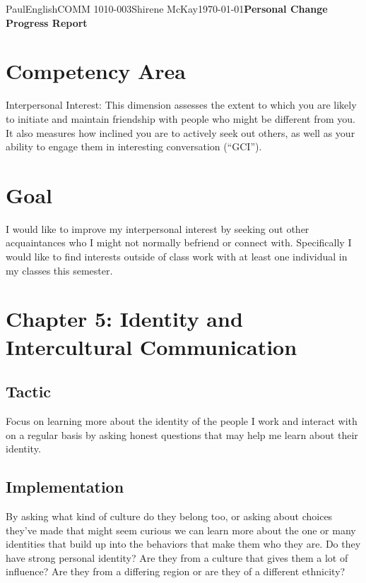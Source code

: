 \documentclass[12pt,letterpaper]{article}
\begin{document}
\begin{mla}{Paul}{English}{COMM 1010-003}{Shirene
    McKay}{\today}{\textbf{Personal Change Progress Report}}

\section{Competency Area}

Interpersonal Interest: This dimension assesses the extent to which
you are likely to initiate and maintain friendship with people who
might be different from you. It also measures how inclined you are to
actively seek out others, as well as your ability to engage them in
interesting conversation (``GCI'').

\section{Goal}

I would like to improve my interpersonal interest by seeking out other
acquaintances who I might not normally befriend or connect with.
Specifically I would like to find interests outside of class work with
at least one individual in my classes this semester.

\section{Chapter 5: Identity and Intercultural Communication}
\subsection{Tactic}
Focus on learning more about the identity of the people I work and
interact with on a regular basis by asking honest questions that may
help me learn about their identity.

\subsection{Implementation}
By asking what kind of culture do they belong too, or asking about
choices they've made that might seem curious we can learn more about
the one or many identities that build up into the behaviors that make
them who they are. Do they have strong personal identity? Are they
from a culture that gives them a lot of influence? Are they from a
differing region or are they of a different ethnicity?


\end{mla}
\end{document}
